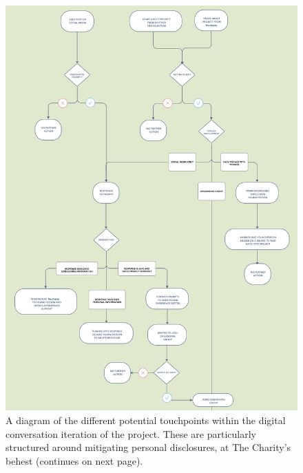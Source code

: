 \begin{figure}[hbt!]
    \centering

\includegraphics[width=1\linewidth]{Images/7/process-1.png}
    \caption{A diagram of the different potential touchpoints within the digital conversation iteration of the project. These are particularly structured around mitigating personal disclosures, at The Charity's behest (continues on next page).}
        \label{fig:iof-process}
    \end{figure}
